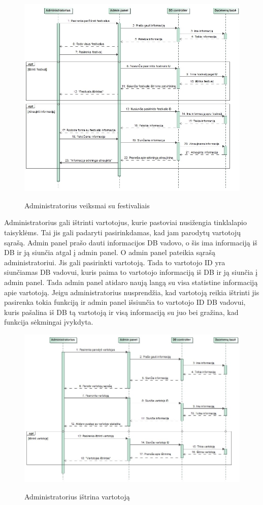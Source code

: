 ﻿\documentclass{VUMIFPSkursinis}
\begin{document}
\begin{figure}[H]
    \centering
    \includegraphics[scale=0.45]{img/Pav/AdminIstrintiAtnaujintiFest}
    \label{img:uml12}
	\caption{Administratorius veiksmai su festivaliais}
\end{figure}	
	
Administratorius gali ištrinti vartotojus, kurie pastoviai nusižengia tinklalapio taisyklėms. Tai jis gali padaryti pasirinkdamas, kad jam parodytų vartotojų sąrašą. Admin panel prašo dauti informacijos DB vadovo, o šis ima informaciją iš DB ir ją siunčia atgal į admin panel. O admin panel pateikia sąrašą administratoriui. Jis gali pasirinkti vartotoją. Tada to vartotojo ID yra siunčiamas DB vadovui, kuris paima to vartotojo informaciją iš DB ir ją siunčia į admin panel. Tada admin panel atidaro naują langą su visa statistine informaciją apie vartotoją. Jeigu administratorius nusprendžia, kad vartotoją reikia ištrinti jis pasirenka tokia funkciją ir admin panel išsiunčia to vartotojo ID DB vadovui, kuris pašalina iš DB tą vartotoją ir visą informaciją su juo bei gražina, kad funkcija sėkmingai įvykdyta.

\begin{figure}[H]
    \centering
    \includegraphics[scale=0.45]{img/Pav/AdminIstrintiVartotoja}
    \label{img:uml13}
	\caption{Administratorius ištrina vartotoją}
\end{figure}	
	
\end{document}
